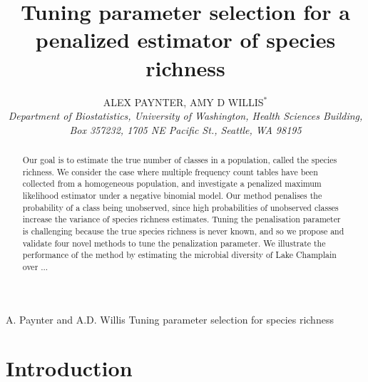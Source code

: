 \documentclass[oupdraft]{bio}
\begin{document}
\title{Tuning parameter selection for a penalized estimator of species richness}

\author{ALEX PAYNTER, AMY D WILLIS$^\ast$\\[4pt]
\textit{Department of Biostatistics,
University of Washington,
Health Sciences Building, Box 357232,
1705 NE Pacific St., Seattle, WA 98195}
}

\markboth%
{A. Paynter and A.D. Willis}
{Tuning parameter selection for species richness}

\maketitle


\begin{abstract}
{Our goal is to estimate the true number of classes in a population, called the species richness.  We consider the case where multiple frequency count tables have been collected from a homogeneous population, and investigate a penalized maximum likelihood estimator under a negative binomial model.
Our method penalises the probability of a class being unobserved, since high probabilities of unobserved classes increase the variance of species richness estimates. Tuning the penalisation parameter is challenging because the true species richness is never known, and so we propose and validate four novel methods to tune the penalization parameter.  We illustrate the performance of the method by estimating the microbial diversity of Lake Champlain over ...}
\end{abstract}


\section{Introduction}
\label{sec:introduction}
\end{document}
